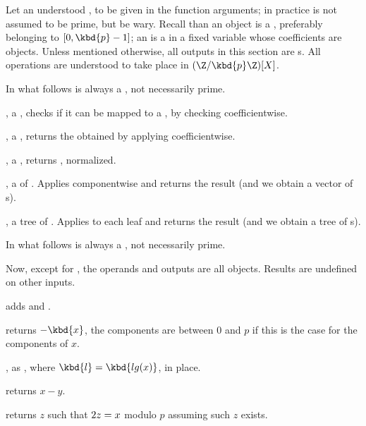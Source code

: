
 Let  an understood , to be given in
the function arguments; in practice  is not assumed to be prime, but
be wary. Recall than an  object is a , preferably belonging
to $[0, \kbd{p}-1]$; an  is a  in a fixed variable whose
coefficients are  objects. Unless mentioned otherwise, all outputs in
this section are s. All operations are understood to take place in
$(\Z/\kbd{p}\Z)[X]$.

 In what follows  is always a ,
not necessarily prime.

,  a ,
checks if it can be mapped to a , by checking 
coefficientwise.

,  a , returns the
 obtained by applying  coefficientwise.

,  a , returns , normalized.

,  a  of . Applies
 componentwise and returns the result (and we obtain a vector
of s).

,  a tree of . Applies
 to each leaf and returns the result (and we obtain a tree
of s).

 In what follows  is always a ,
not necessarily prime.

\noindent Now, except for , the operands and outputs are all 
objects. Results are undefined on other inputs.

 adds  and .

 returns $-\kbd{x}$, the components are
between $0$ and $p$ if this is the case for the components of $x$.

, as , where
$\kbd{l} = \kbd{lg(x)}$, in place.

 returns $x-y$.

 returns $z$ such that $2\*z = x$ modulo
$p$ assuming such $z$ exists.

